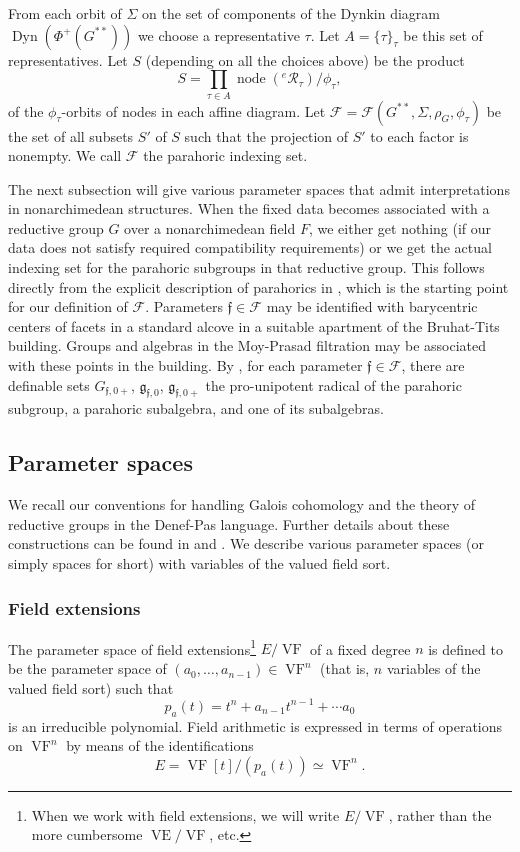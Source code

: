 \documentclass[12pt]{amsart}
\newcommand{\op}[1]{\operatorname{#1}}
\newcommand{\cal}[1]{\mathcal{#1}}
\def\VF{{\op{VF}}}
\def\R{\cal{R}}
\def\s{{\mathfrak{f}}}
\newcommand{\cF}{\mathcal{F}}
\newcommand{\fg}{\mathfrak{g}}
\theoremstyle{plain}
\theoremstyle{definition}
\begin{document}
From each orbit of $\Sigma$ on the set of components of the Dynkin
diagram $\op{Dyn}(\Phi^+(G^{**}))$ we choose a representative
$\tau$.  Let $A = \{\tau\}_\tau$ be this set of representatives.  Let
$S$ (depending on all the choices above) be the product
\[
S = \prod_{\tau\in A} \op{node}({}^e\R_\tau)/\phi_\tau,
\]
of the $\phi_\tau$-orbits of nodes in each affine diagram.  Let $\cF
= \cF(G^{**},\Sigma,\rho_G,\phi_\tau)$ be the set of all
subsets $S'$ of $S$ such that the projection of $S'$ to each factor is
nonempty.  We call $\cF$ the parahoric indexing set.

The next subsection will give various parameter spaces that admit
interpretations in nonarchimedean structures.  When the fixed data
becomes associated with a reductive group $G$ over a nonarchimedean
field $F$, we either get nothing (if our data does not satisfy
required compatibility requirements) or we get the actual indexing set
for the parahoric subgroups in that reductive group.  This follows
directly from the explicit description of parahorics in \cite{Gross},
which is the starting point for our definition of $\cF$.  Parameters
$\s\in \cF$ may be identified with barycentric centers of facets in a
standard alcove in a suitable apartment of the Bruhat-Tits building.
Groups and algebras in the Moy-Prasad filtration may be associated
with these points in the building.  By \cite{CGH}, for each parameter
$\s\in \cF$, there are definable sets $G_{\s,0+}$, $\fg_{\s,0}$,
$\fg_{\s,0+}$ the pro-unipotent radical of the parahoric subgroup, a
parahoric subalgebra, and one of its subalgebras.

\subsection{Parameter spaces}

We recall our conventions for handling Galois cohomology and the
theory of reductive groups in the Denef-Pas language.  Further details
about these constructions can be found in \cite{CHL} and \cite{CGH}.
We describe various parameter spaces (or simply spaces for short) with
variables of the valued field sort.


\subsubsection{Field extensions}

The parameter space of field extensions\footnote{When we work with
  field extensions, we will write $E/\VF$, rather than the more
  cumbersome $\op{VE}/\VF$, etc.} $E/\VF$ of a fixed degree $n$ is defined
to be the parameter space of $(a_0,\ldots,a_{n-1})\in \VF^n$ (that is,
$n$ variables of the valued field sort) such that
\[
p_a(t) = t^n + a_{n-1} t^{n-1} + \cdots a_0
\]
is an irreducible polynomial.  Field arithmetic is expressed in terms
of operations on $\VF^n$ by means of the identifications
\[
E = \VF[t]/(p_a(t)) \simeq \VF^n.
\]
\end{document}
